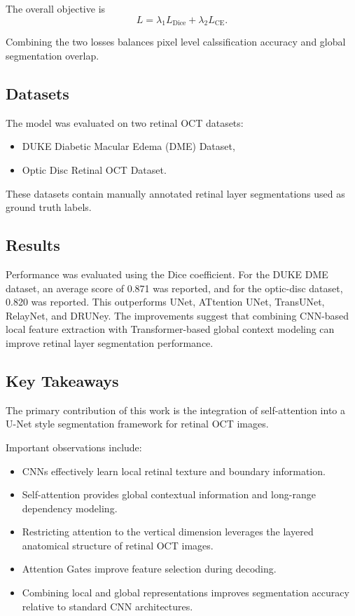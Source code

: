 \documentclass[11pt]{article}
\begin{document}
The overall objective is\[L=\lambda_1 L_{\text{Dice}}+\lambda_2 L_{\text{CE}}.\]

Combining the two losses balances pixel level calssification accuracy and global segmentation overlap.

\subsection*{Datasets}

The model was evaluated on two retinal OCT datasets:

\begin{itemize}
    \item DUKE Diabetic Macular Edema (DME) Dataset,
    \item Optic Disc Retinal OCT Dataset.
\end{itemize}

These datasets contain manually annotated retinal layer segmentations used as ground truth labels.

\subsection*{Results}

Performance was evaluated using the Dice coefficient. For the DUKE DME dataset, an average score of 0.871 was reported, and for the optic-disc dataset, 0.820 was reported.
This outperforms UNet, ATtention UNet, TransUNet, RelayNet, and DRUNey. The improvements suggest that combining CNN-based local feature extraction with Transformer-based global context modeling can improve retinal layer segmentation performance.

\subsection*{Key Takeaways}

The primary contribution of this work is the integration of self-attention into a U-Net style segmentation framework for retinal OCT images.

Important observations include:

\begin{itemize}
    \item CNNs effectively learn local retinal texture and boundary information.
    \item Self-attention provides global contextual information and long-range dependency modeling.
    
    \item Restricting attention to the vertical dimension leverages the layered anatomical structure of retinal OCT images.
    
    \item Attention Gates improve feature selection during decoding.
    
    \item Combining local and global representations improves segmentation accuracy relative to standard CNN architectures.
\end{itemize}
\end{document}
